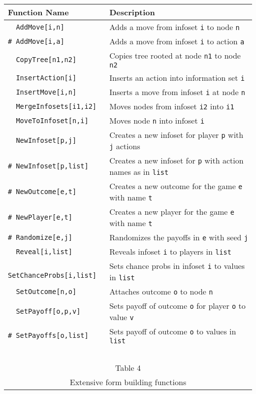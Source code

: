 \begin{table}[htp]
\begin{center}
\begin{tabular} {|l||l|} \hline
Function Name	& Description \\ 
\hline
\verb+  AddMove[i,n]+ &Adds a move from infoset \verb+i+ to node \verb+n+ \\
\verb+# AddMove[i,a]+ &Adds a move from infoset \verb+i+ to action \verb+a+ \\
\verb+  CopyTree[n1,n2]+ &Copies tree rooted at node \verb+n1+ to node \verb+n2+ \\
\verb+  InsertAction[i]+ &Inserts an action into information set \verb+i+ \\
\verb+  InsertMove[i,n]+ &Inserts a move from infoset \verb+i+ at node \verb+n+\\
\verb+  MergeInfosets[i1,i2]+ &Moves nodes from infoset \verb+i2+ into \verb+i1+\\
\verb+  MoveToInfoset[n,i]+ &Moves node \verb+n+ into infoset \verb+i+\\
\verb+  NewInfoset[p,j]+ &Creates a new infoset for player \verb+p+ with \verb+j+ actions\\
\verb+# NewInfoset[p,list]+ &Creates a new infoset for \verb+p+ with action names as in \verb+list+\\
\verb+# NewOutcome[e,t]+ &Creates a new outcome for the game \verb+e+
with name \verb+t+\\
\verb+# NewPlayer[e,t]+ &Creates a new player for the game \verb+e+
with name \verb+t+\\
\verb+# Randomize[e,j]+ &Randomizes the payoffs in \verb+e+ with seed \verb+j+\\
\verb+  Reveal[i,list]+ &Reveals infoset \verb+i+ to players in \verb+list+\\
\verb+  SetChanceProbs[i,list]+ &Sets chance probs in infoset \verb+i+ to values in \verb+list+\\
\verb+  SetOutcome[n,o]+ &Attaches outcome \verb+o+ to node \verb+n+ \\
\verb+  SetPayoff[o,p,v]+ &Sets payoff of outcome \verb+o+ for player \verb+o+ to value \verb+v+\\
\verb+# SetPayoffs[o,list]+ &Sets payoff of outcome \verb+o+ to values in \verb+list+\\
\hline
\multicolumn{2}{c}{\ }\\
\multicolumn{2}{c}{Table 4}\\
\multicolumn{2}{c}{Extensive form building functions}\\
\end{tabular}
\end{center}
\end{table}
\medskip

